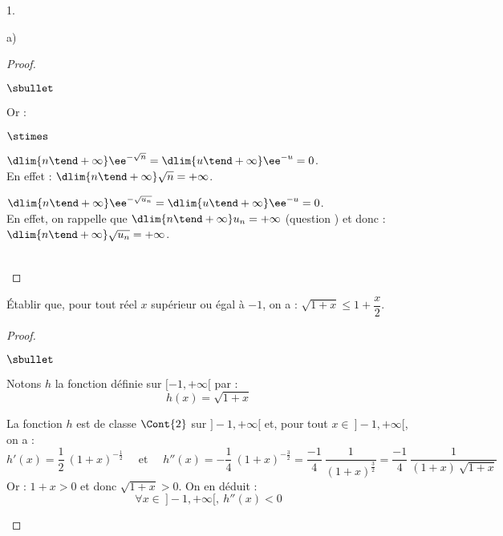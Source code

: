 \documentclass[11pt]{article}%
\begin{document}
\begin{noliste}{1.}
\begin{noliste}{a)}
\begin{proof}
\begin{noliste}{$\sbullet$}
      \item Or :
       \begin{noliste}{$\stimes$}
       \item $\dlim{n \tend +\infty} \ee^{-\sqrt{n}} = \dlim{u \tend
           +\infty} \ee^{-u} = 0$.\\[.1cm]
         En effet : $\dlim{n \tend +\infty} \sqrt{n} = +\infty$. 
       \item $\dlim{n \tend +\infty} \ee^{-\sqrt{u_n}} = \dlim{u \tend
           +\infty} \ee^{-u} = 0$.\\[.1cm]
         En effet, on rappelle que $\dlim{n \tend +\infty} u_n =
         +\infty$ (question ) et donc : $\dlim{n \tend
           +\infty} \sqrt{u_n} = +\infty$.
       \end{noliste}
     \end{noliste}
     ~\\[-1.2cm]
    \end{proof}

  \item Établir que, pour tout réel $x$ supérieur ou égal à $-1$, on a
    : $\sqrt{1 + x} \leq 1 + \dfrac{x}{2}$.

    \begin{proof}~%
      \begin{noliste}{$\sbullet$}
      \item Notons $h$ la fonction définie sur $[-1,+\infty[$ par :
        \[
        h(x) = \sqrt{1+x}
        \]

      \item La fonction $h$ est de classe $\Cont{2}$ sur
        $]-1,+\infty[$ et, pour tout $x\in \ ]-1,+\infty[$, on a :
        \[
        h'(x) = \dfrac{1}{2} \ (1+x)^{-\frac{1}{2}}
        \quad \text{ et } \quad h''(x) = -\dfrac{1}{4} \
        (1+x)^{-\frac{3}{2}} = \dfrac{-1}{4} \
        \dfrac{1}{(1+x)^{\frac{3}{2}}} = \dfrac{-1}{4} \
        \dfrac{1}{(1+x) \ \sqrt{1+x}}
        \]
        Or : $1+x > 0$ et donc $\sqrt{1+x} > 0$. On en déduit :
        \[
        \forall x \in \ ]-1,+\infty[, \ h''(x)<0
        \]


\end{noliste}
\end{proof}
\end{noliste}
\end{noliste}
\end{document}
